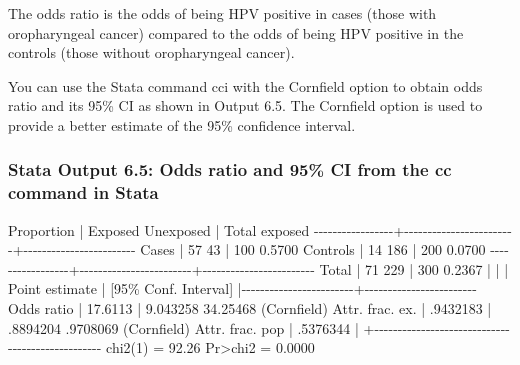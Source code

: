 \documentclass[
]{memoir}
\newenvironment{Shaded}{\begin{snugshade}}{\end{snugshade}}
\newcommand{\NormalTok}[1]{#1}
\begin{document}
The odds ratio is the odds of being HPV positive in cases (those with oropharyngeal cancer) compared to the odds of being HPV positive in the controls (those without oropharyngeal cancer).

You can use the Stata command cci with the Cornfield option to obtain odds ratio and its 95\% CI as shown in Output 6.5. The Cornfield option is used to provide a better estimate of the 95\% confidence interval.

\hypertarget{stata-output-6.5-odds-ratio-and-95-ci-from-the-cc-command-in-stata}{%
\subsubsection*{Stata Output 6.5: Odds ratio and 95\% CI from the cc command in Stata}\label{stata-output-6.5-odds-ratio-and-95-ci-from-the-cc-command-in-stata}}

\begin{Shaded}
\begin{Highlighting}[]
\NormalTok{                                                         Proportion}
\NormalTok{                 |   Exposed   Unexposed  |      Total      exposed}
\NormalTok{{-}{-}{-}{-}{-}{-}{-}{-}{-}{-}{-}{-}{-}{-}{-}{-}{-}+{-}{-}{-}{-}{-}{-}{-}{-}{-}{-}{-}{-}{-}{-}{-}{-}{-}{-}{-}{-}{-}{-}{-}{-}+{-}{-}{-}{-}{-}{-}{-}{-}{-}{-}{-}{-}{-}{-}{-}{-}{-}{-}{-}{-}{-}{-}{-}{-}}
\NormalTok{           Cases |        57          43  |        100       0.5700}
\NormalTok{        Controls |        14         186  |        200       0.0700}
\NormalTok{{-}{-}{-}{-}{-}{-}{-}{-}{-}{-}{-}{-}{-}{-}{-}{-}{-}+{-}{-}{-}{-}{-}{-}{-}{-}{-}{-}{-}{-}{-}{-}{-}{-}{-}{-}{-}{-}{-}{-}{-}{-}+{-}{-}{-}{-}{-}{-}{-}{-}{-}{-}{-}{-}{-}{-}{-}{-}{-}{-}{-}{-}{-}{-}{-}{-}}
\NormalTok{           Total |        71         229  |        300       0.2367}
\NormalTok{                 |                        |}
\NormalTok{                 |      Point estimate    |    [95\% Conf. Interval]}
\NormalTok{                 |{-}{-}{-}{-}{-}{-}{-}{-}{-}{-}{-}{-}{-}{-}{-}{-}{-}{-}{-}{-}{-}{-}{-}{-}+{-}{-}{-}{-}{-}{-}{-}{-}{-}{-}{-}{-}{-}{-}{-}{-}{-}{-}{-}{-}{-}{-}{-}{-}}
\NormalTok{      Odds ratio |          17.6113       |    9.043258    34.25468 (Cornfield)}
\NormalTok{ Attr. frac. ex. |         .9432183       |    .8894204    .9708069 (Cornfield)}
\NormalTok{ Attr. frac. pop |         .5376344       |}
\NormalTok{                 +{-}{-}{-}{-}{-}{-}{-}{-}{-}{-}{-}{-}{-}{-}{-}{-}{-}{-}{-}{-}{-}{-}{-}{-}{-}{-}{-}{-}{-}{-}{-}{-}{-}{-}{-}{-}{-}{-}{-}{-}{-}{-}{-}{-}{-}{-}{-}{-}{-}}
\NormalTok{                               chi2(1) =    92.26  Pr\textgreater{}chi2 = 0.0000}
\end{Highlighting}
\end{Shaded}
\end{document}
